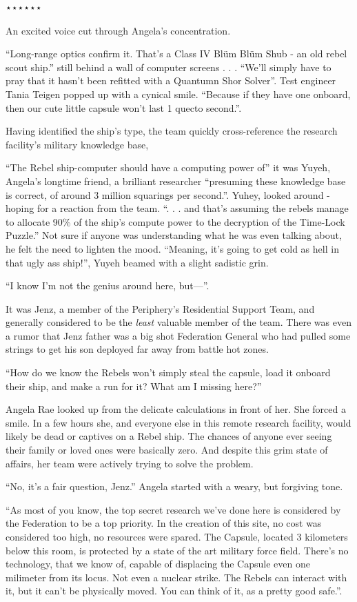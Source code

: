 \documentclass[smalldemyvopaper,11pt,twoside,onecolumn,openright,extrafontsizes]{memoir}
\begin{document}
⋆⋆⋆⋆⋆⋆


An excited voice cut through Angela’s concentration.

 
 “Long-range optics confirm it. That’s a Class IV Blüm Blüm Shub - an old rebel scout ship.” still behind a wall of computer screens . . . “We’ll simply have to pray that it hasn’t been refitted with a Quantumn Shor Solver”. Test engineer Tania Teigen popped up with a cynical smile. “Because if they have one onboard, then our cute little capsule won’t last 1 quecto second.”.

 
  Having identified the ship’s type, the team quickly cross-reference the research facility’s military knowledge base,

 
  “The Rebel ship-computer should have a computing power of” it was Yuyeh, Angela’s longtime friend, a brilliant researcher “presuming these knowledge base is correct, of around 3 million squarings per second.”. Yuhey, looked around - hoping for a reaction from the team. “. . . and that’s assuming the rebels manage to allocate 90\% of the ship’s compute power to the decryption of the Time-Lock Puzzle.” Not sure if anyone was understanding what he was even talking about, he felt the need to lighten the mood. “Meaning, it’s going to get cold as hell in that ugly ass ship!”, Yuyeh beamed with a slight sadistic grin.

 
  “I know I’m not the genius around here, but—”.

 
  It was Jenz, a member of the Periphery’s Residential Support Team, and generally considered to be the \textit{least} valuable member of the team. There was even a rumor that Jenz father was a big shot Federation General who had pulled some strings to get his son deployed far away from battle hot zones.

 
  “How do we know the Rebels won’t simply steal the capsule, load it onboard their ship, and make a run for it? What am I missing here?”

 
  Angela Rae looked up from the delicate calculations in front of her. She forced a smile. In a few hours she, and everyone else in this remote research facility, would likely be dead or captives on a Rebel ship. The chances of anyone ever seeing their family or loved ones were basically zero. And despite this grim state of affairs, her team were actively trying to solve the problem.

 
  “No, it’s a fair question, Jenz.” Angela started with a weary, but forgiving tone.

 
  “As most of you know, the top secret research we’ve done here is considered by the Federation to be a top priority. In the creation of this site, no cost was considered too high, no resources were spared. The Capsule, located 3 kilometers below this room, is protected by a state of the art military force field. There’s no technology, that we know of, capable of displacing the Capsule even one milimeter from its locus. Not even a nuclear strike. The Rebels can interact with it, but it can’t be physically moved. You can think of it, as a pretty good safe.”.
\end{document}
